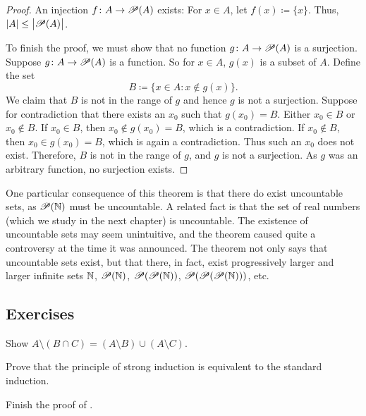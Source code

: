 \begin{proof}
An injection $f \colon A \to {\mathscr{P}}(A)$ exists:
For $x \in A$, let $f(x) \coloneqq \{ x \}$.  Thus,
$\lvert {A} \rvert \leq \bigl\lvert {{\mathscr{P}}(A)} \bigr\rvert$.

To finish the proof, we must show that
no function $g \colon A \to {\mathscr{P}}(A)$ is a surjection.
Suppose 
$g \colon A \to {\mathscr{P}}(A)$ is a function.  So for $x \in A$,
$g(x)$ is a subset of $A$.  Define the set
\begin{equation*}
B \coloneqq \bigl\{ x \in A : x \notin g(x) \bigr\} .
\end{equation*}
We claim that $B$ is not in the range of $g$ and hence $g$ is not a
surjection.  Suppose for contradiction that there exists an $x_0$ such that $g(x_0) = B$.
Either $x_0 \in B$ or $x_0 \notin B$.  If $x_0 \in B$, then $x_0 \notin
g(x_0) = B$, which is a contradiction.  If $x_0 \notin B$, then $x_0 \in
g(x_0) = B$, which is again a contradiction.  Thus such an $x_0$ does not
exist.  Therefore, $B$ is not in the range of $g$, and $g$ is not a
surjection.  As $g$ was an arbitrary function, no surjection exists.
\end{proof}

One particular consequence of this 
theorem is that there do exist uncountable sets,
as ${\mathscr{P}}({\mathbb{N}})$ must be uncountable.
A related fact is that
the set of real numbers (which we study in the next chapter) is uncountable.
The existence of uncountable sets may seem unintuitive, and the theorem
caused quite a controversy at the time
it was announced.  The theorem not only says that uncountable sets exist,
but that there, in fact, exist progressively larger
and larger infinite sets ${\mathbb{N}}$, ${\mathscr{P}}({\mathbb{N}})$,
${\mathscr{P}}({\mathscr{P}}({\mathbb{N}}))$, ${\mathscr{P}}({\mathscr{P}}({\mathscr{P}}({\mathbb{N}})))$, etc.

\subsection{Exercises}

\begin{exercise}
Show
$A \setminus (B \cap C) = (A \setminus B) \cup (A \setminus C)$.
\end{exercise}

\begin{exercise}
Prove that the principle of strong induction is equivalent to the standard
induction.
\end{exercise}

\begin{exercise}
Finish the proof of .
\end{exercise}

